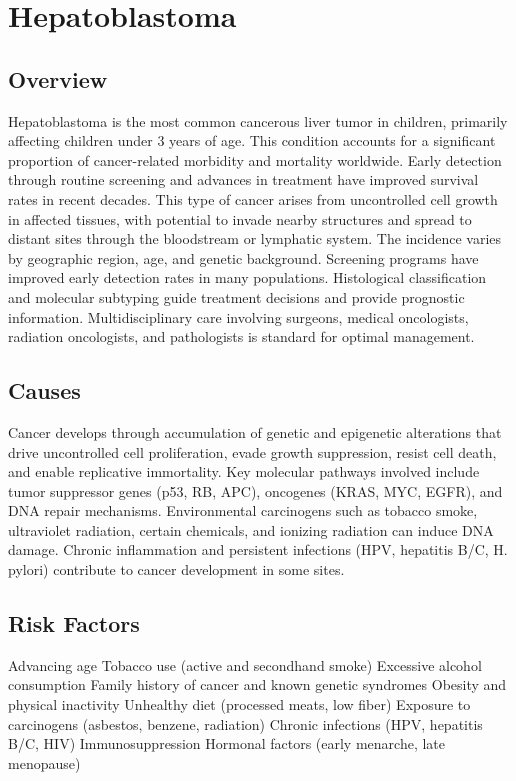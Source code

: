 \chapter{Hepatoblastoma}
\label{sec:Hepatoblastoma}

\section{Overview}
Hepatoblastoma is the most common cancerous liver tumor in children, primarily affecting children under 3 years of age. This condition accounts for a significant proportion of cancer-related morbidity and mortality worldwide. Early detection through routine screening and advances in treatment have improved survival rates in recent decades. This type of cancer arises from uncontrolled cell growth in affected tissues, with potential to invade nearby structures and spread to distant sites through the bloodstream or lymphatic system. The incidence varies by geographic region, age, and genetic background. Screening programs have improved early detection rates in many populations. Histological classification and molecular subtyping guide treatment decisions and provide prognostic information. Multidisciplinary care involving surgeons, medical oncologists, radiation oncologists, and pathologists is standard for optimal management.
\section{Causes}
Cancer develops through accumulation of genetic and epigenetic alterations that drive uncontrolled cell proliferation, evade growth suppression, resist cell death, and enable replicative immortality. Key molecular pathways involved include tumor suppressor genes (p53, RB, APC), oncogenes (KRAS, MYC, EGFR), and DNA repair mechanisms. Environmental carcinogens such as tobacco smoke, ultraviolet radiation, certain chemicals, and ionizing radiation can induce DNA damage. Chronic inflammation and persistent infections (HPV, hepatitis B/C, H. pylori) contribute to cancer development in some sites.
\section{Risk Factors}
Advancing age Tobacco use (active and secondhand smoke) Excessive alcohol consumption Family history of cancer and known genetic syndromes Obesity and physical inactivity Unhealthy diet (processed meats, low fiber) Exposure to carcinogens (asbestos, benzene, radiation) Chronic infections (HPV, hepatitis B/C, HIV) Immunosuppression Hormonal factors (early menarche, late menopause)

